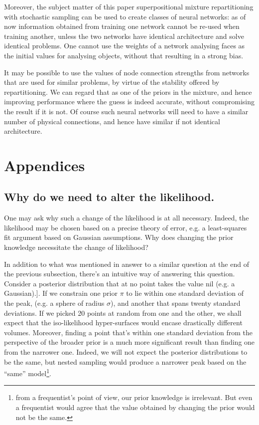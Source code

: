 \documentclass[usenatbib]{mnras}
\begin{document}
Moreover, the subject matter of this paper superpositional mixture
repartitioning with stochastic sampling can be used to create
classes of neural networks: as of now information obtained from
training one network cannot be re-used when training another,
unless the two networks have identical architecture and solve
identical problems. One cannot use the weights of a network
analysing faces as the initial values for analysing objects,
without that resulting in a strong bias. 

It may be possible to use the values of node connection strengths
from networks that are used for similar problems, by virtue of the
stability offered by repartitioning. We can regard that as one of
the priors in the mixture, and hence improving performance where
the guess is indeed accurate, without compromising the result if it
is not. Of course such neural networks will need to have a similar
number of physical connections, and hence have similar if not
identical architecture.

 


\section{Appendices}
\label{sec:org93f7e04}

\subsection{Why do we need to alter the likelihood. \label{sec:repart-necessity}}
\label{sec:org51b07f2}
One may ask why such a change of the likelihood is at all
necessary. Indeed, the likelihood may be chosen based on a precise
theory of error, e.g. a least-squares fit argument based on
Gaussian assumptions. Why does changing the prior knowledge
necessitate the change of likelihood?

In addition to what was mentioned in answer to a similar question
at the end of the previous subsection, there's an intuitive way of
answering this question. Consider a posterior distribution that at
no point takes the value nil (e.g. a Gaussian).]. If we constrain one
prior \(\pi\) to lie within one standard deviation of the peak,
(e.g. a sphere of radius \(\sigma\)), and another that spans twenty
standard deviations. If we picked 20 points at random from one and
the other, we shall expect that the iso-likelihood hyper-surfaces
would encase drastically different volumes. Moreover, finding a
point that's within one standard deviation from the perspective of
the broader prior is a much more significant result than finding
one from the narrower one. Indeed, we will not expect the posterior
distributions to be the same, but nested sampling would produce a
narrower peak based on the ``same'' model\footnote{from a frequentist's point of view, our prior knowledge is
irrelevant. But even a frequentist would agree that the value obtained
by changing the prior would not be the same.}. 
\end{document}

